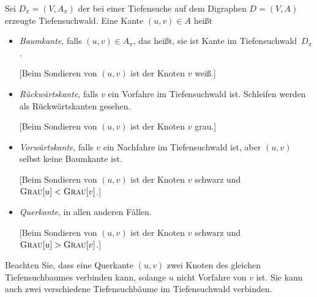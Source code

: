 \begin{defn}
\label{def:kantenarten-tiefensuche}
Sei $D_\pi=(V,A_\pi)$ der bei einer Tiefensuche auf dem Digraphen $D=(V,A)$ erzeugte Tiefensuchwald.
Eine Kante $(u,v) \in A$ heißt
\begin{itemize}
 \item \emph{Baumkante}, falls $(u,v) \in A_\pi$, das heißt, sie ist Kante im Tiefensuchwald~$D_\pi$.
 
 [Beim Sondieren von $(u,v)$ ist der Knoten $v$ weiß.]
 
 \item \emph{Rückwärtskante}, falls $v$ ein Vorfahre im Tiefensuchwald ist.
 Schleifen werden als Rückwärtskanten gesehen.
 
 [Beim Sondieren von $(u,v)$ ist der Knoten $v$ grau.]
 
 \item \emph{Vorwärtskante}, falls $v$ ein Nachfahre im Tiefensuchwald ist, aber $(u,v)$ selbst keine Baumkante ist.
 
 [Beim Sondieren von $(u,v)$ ist der Knoten $v$ schwarz und $\mathop{\text{\textsc{Grau}}}[u] < \mathop{\text{\textsc{Grau}}}[v]$.]

 \item \emph{Querkante}, in allen anderen Fällen.
 
 [Beim Sondieren von $(u,v)$ ist der Knoten $v$ schwarz und $\mathop{\text{\textsc{Grau}}}[u] > \mathop{\text{\textsc{Grau}}}[v]$.]
 
\end{itemize}
\end{defn}

\begin{bem} 
Beachten Sie, dass eine Querkante $(u,v)$ zwei Knoten des gleichen Tiefensuchbaumes verbinden kann, solange $u$ nicht Vorfahre von $v$ ist.
Sie kann auch zwei verschiedene Tiefensuchbäume im Tiefensuchwald verbinden.
\end{bem} 


